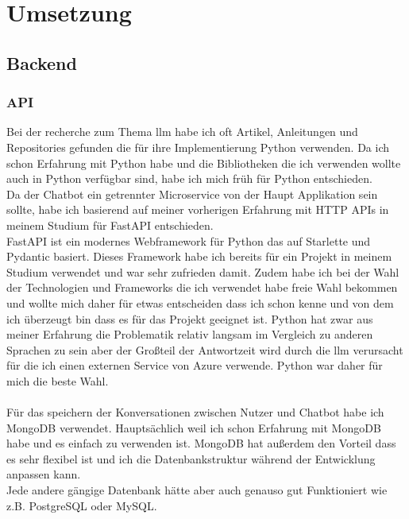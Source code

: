 \chapter{Umsetzung}\label{ch:umsetzung}
\section{Backend}\label{sec:umsetzung_backend}
\subsection{API}\label{sec:umsetzung_api}
Bei der recherche zum Thema \gls{llm} habe ich oft Artikel, Anleitungen und Repositories gefunden die für ihre Implementierung Python verwenden.
Da ich schon Erfahrung mit Python habe und die Bibliotheken die ich verwenden wollte auch in Python verfügbar sind, habe ich mich früh für Python entschieden.\\
Da der Chatbot ein getrennter Microservice von der Haupt Applikation sein sollte, habe ich basierend auf meiner vorherigen Erfahrung mit HTTP APIs in meinem Studium für FastAPI entschieden.\\
FastAPI ist ein modernes Webframework für Python das auf Starlette und Pydantic basiert. 
Dieses Framework habe ich bereits für ein Projekt in meinem Studium verwendet und war sehr zufrieden damit.
Zudem habe ich bei der Wahl der Technologien und Frameworks die ich verwendet habe freie Wahl bekommen und wollte
mich daher für etwas entscheiden dass ich schon kenne und von dem ich überzeugt bin dass es für das Projekt geeignet ist.
Python hat zwar aus meiner Erfahrung die Problematik relativ langsam im Vergleich zu anderen Sprachen zu sein aber der Großteil der Antwortzeit wird durch die \gls{llm} verursacht 
für die ich einen externen Service von Azure verwende. Python war daher für mich die beste Wahl.\\\\
Für das speichern der Konversationen zwischen Nutzer und Chatbot habe ich MongoDB verwendet. Hauptsächlich weil ich schon Erfahrung mit MongoDB habe und es einfach zu verwenden ist.
MongoDB hat außerdem den Vorteil dass es sehr flexibel ist und ich die Datenbankstruktur während der Entwicklung anpassen kann.\\
Jede andere gängige Datenbank hätte aber auch genauso gut Funktioniert wie z.B. PostgreSQL oder MySQL.\\

